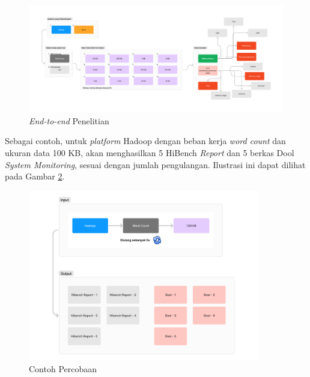 \begin{landscape}
\begin{figure}[h]
    \centering
    \includegraphics[width=\linewidth, height=0.5\linewidth]{figures/ch03/flow-penelitian-umum.png}
    \caption{\textit{End-to-end} Penelitian}
    \label{fig:flow-penelitian-umum}
\end{figure}
\end{landscape}

Sebagai contoh, untuk \textit{platform} Hadoop dengan beban kerja \textit{word count} dan ukuran data 100 KB, akan menghasilkan 5 HiBench \textit{Report} dan 5 berkas Dool \textit{System Monitoring}, sesuai dengan jumlah pengulangan.  Ilustrasi ini dapat dilihat pada Gambar \ref{fig:contoh-percobaan}.

\begin{figure}[h]
    \centering
    \includegraphics[width=0.9\textwidth]{figures/ch03/contoh-percobaan.png}
    \caption{Contoh Percobaan}
    \label{fig:contoh-percobaan}
\end{figure}

